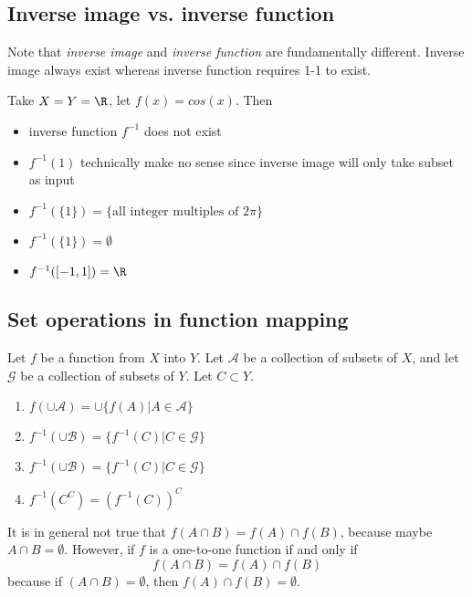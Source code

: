 \begin{refsection}
\subsection{Inverse image vs. inverse function}
\begin{note}
Note that \emph{inverse image} and \emph{inverse function} are fundamentally different. Inverse image always exist whereas inverse function requires 1-1 to exist. 
\end{note}




\begin{example}
Take $X=Y=\R$, let $f(x) = cos(x)$. Then
\begin{itemize}
    \item inverse function $f^{-1}$ does not exist
    \item $f^{-1}(1)$ technically make no sense since inverse image will only take subset as input
    \item $f^{-1}(\{1\})=\{\text{all integer multiples of }2\pi \}$
    \item $f^{-1}(\{1\})=\emptyset$
    \item $f^{-1}([-1, 1])=\R$
    
\end{itemize}
\end{example}

\subsection{Set operations in function mapping}
\begin{lemma}\cite[7]{johnsonbaugh2010foundations}
Let $f$ be a function from $X$ into $Y$. Let $\mathcal{A}$ be a collection of subsets of $X$, and let $\mathcal{G}$ be a collection of subsets of $Y$. Let $C \subset Y$.
\begin{enumerate}
    \item $f(\cup \mathcal{A}) = \cup \{f(A)|A\in\mathcal{A}\}$
    \item $f^{-1}(\cup \mathcal{B}) = \{f^{-1}(C)|C \in \mathcal{G} \}$
    \item $f^{-1}(\cup \mathcal{B}) = \{f^{-1}(C)|C \in \mathcal{G} \}$
    \item $f^{-1}(C^C) = (f^{-1}(C))^C$
\end{enumerate}
\end{lemma}

\begin{remark}
It is in general not true that $f(A\cap B) = f(A)\cap f(B)$, because maybe $A\cap B = \emptyset$. However, if $f$ is a one-to-one function if and only if 
$$f(A\cap B) = f(A)\cap f(B)$$
because if $(A\cap B) = \emptyset$, then $f(A)\cap f(B) = \emptyset$.
\end{remark}


\end{refsection}
